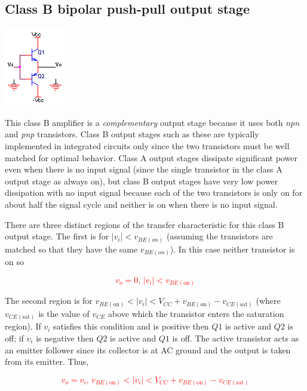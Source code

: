 \subsection{Class B bipolar push-pull output stage}
\begin{center}
	\includegraphics{schematics/classBoutput.PNG}
\end{center}
This class B amplifier is a \textit{complementary} output stage because it uses both \textit{npn} and \textit{pnp} transistors. Class B output stages such as these are typically implemented in integrated circuits only since the two transistors must be well matched for optimal behavior. Class A output stages dissipate significant power even when there is no input signal (since the single transistor in the class A output stage as always on), but class B output stages have very low power dissipation with no input signal because each of the two transistors is only on for about half the signal cycle and neither is on when there is no input signal.
\par
There are three distinct regions of the transfer characteristic for this class B output stage. The first is for $|v_{i}| < v_{BE(on)}$ (assuming the transistors are matched so that they have the same $v_{BE(on)}$). In this case neither transistor is on so

\textcolor{red}{
\begin{equation}
v_{o} = 0\text{, }|v_{i}| < v_{BE(\text{on})}
\end{equation}
}

The second region is for $v_{BE(\text{on})} < |v_{i}| < V_{CC} + v_{BE(\text{on})} - v_{CE(\text{sat})}$ (where $v_{CE(\text{sat})}$ is the value of $v_{CE}$ above which the transistor enters the saturation region). If $v_{i}$ satisfies this condition and is positive then $Q1$ is active and $Q2$ is off; if $v_{i}$ is negative then $Q2$ is active and $Q1$ is off. The active transistor acts as an emitter follower since its collector is at AC ground and the output is taken from its emitter. Thus,

\textcolor{red}{
\begin{equation}
v_{o} = v_{i}\text{, }v_{BE(\text{on})} < |v_{i}| < V_{CC} + v_{BE(\text{on})}-v_{CE(\text{sat})}
\end{equation}
}

